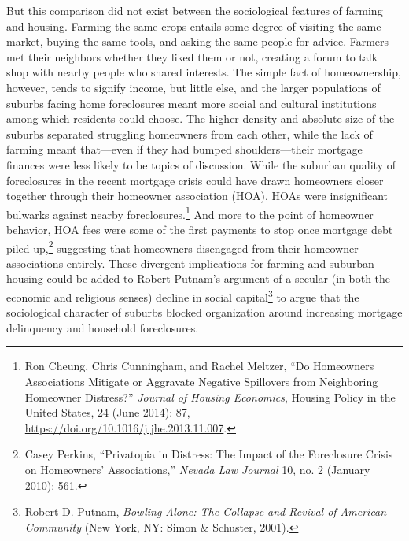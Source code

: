 \documentclass[12pt,oneside]{psthesis}
\begin{document}
But this comparison did not exist between the sociological features of farming and housing.
Farming the same crops entails some degree of visiting the same market, buying the same tools, and asking the same people for advice.
Farmers met their neighbors whether they liked them or not, creating a forum to talk shop with nearby people who shared interests.
The simple fact of homeownership, however, tends to signify income, but little else, and the larger populations of suburbs facing home foreclosures meant more social and cultural institutions among which residents could choose.
The higher density and absolute size of the suburbs separated struggling homeowners from each other, while the lack of farming meant that---even if they had bumped shoulders---their mortgage finances were less likely to be topics of discussion.
While the suburban quality of foreclosures in the recent mortgage crisis could have drawn homeowners closer together through their homeowner association (HOA), HOAs were insignificant bulwarks against nearby foreclosures.\footnote{Ron Cheung, Chris Cunningham, and Rachel Meltzer, ``Do Homeowners Associations Mitigate or Aggravate Negative Spillovers from Neighboring Homeowner Distress?'' \emph{Journal of Housing Economics}, Housing Policy in the United States, 24 (June 2014): 87, \url{https://doi.org/10.1016/j.jhe.2013.11.007}.}
And more to the point of homeowner behavior, HOA fees were some of the first payments to stop once mortgage debt piled up,\footnote{Casey Perkins, ``Privatopia in Distress: The Impact of the Foreclosure Crisis on Homeowners' Associations,'' \emph{Nevada Law Journal} 10, no. 2 (January 2010): 561.} suggesting that homeowners disengaged from their homeowner associations entirely.
These divergent implications for farming and suburban housing could be added to Robert Putnam's argument of a secular (in both the economic and religious senses) decline in social capital\footnote{Robert D. Putnam, \emph{Bowling Alone: The Collapse and Revival of American Community} (New York, NY: Simon \& Schuster, 2001).} to argue that the sociological character of suburbs blocked organization around increasing mortgage delinquency and household foreclosures.
\end{document}
